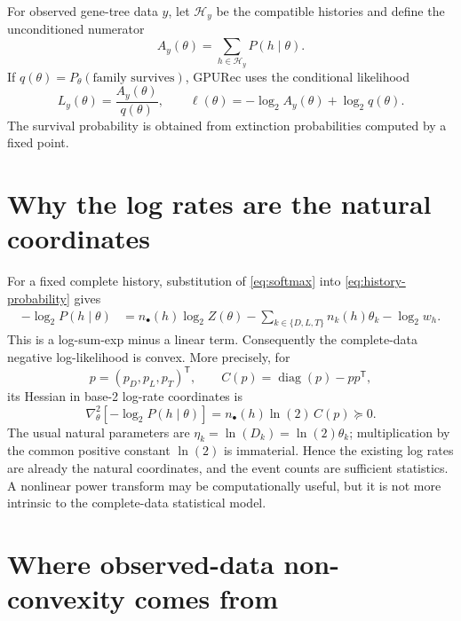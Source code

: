 \documentclass[11pt]{article}
\newcommand{\diag}{\operatorname{diag}}
\begin{document}
For observed gene-tree data $y$, let $\mathcal H_y$ be the compatible histories and define the
unconditioned numerator
\[
  A_y(\theta)=\sum_{h\in\mathcal H_y}P(h\mid\theta).
\]
If $q(\theta)=P_\theta(\text{family survives})$, GPURec uses the conditional likelihood
\begin{equation}
  L_y(\theta)=\frac{A_y(\theta)}{q(\theta)},
  \qquad
  \ell(\theta)=-\log_2 A_y(\theta)+\log_2 q(\theta).
  \label{eq:conditioned-likelihood}
\end{equation}
The survival probability is obtained from extinction probabilities computed by a fixed point.

\section{Why the log rates are the natural coordinates}

For a fixed complete history, substitution of \eqref{eq:softmax} into
\eqref{eq:history-probability} gives
\begin{align}
  -\log_2 P(h\mid\theta)
  &=n_\bullet(h)\log_2 Z(\theta)
    -\sum_{k\in\{D,L,T\}}n_k(h)\theta_k
    -\log_2 w_h.                                      \label{eq:complete-nll}
\end{align}
This is a log-sum-exp minus a linear term.  Consequently the complete-data negative
log-likelihood is convex.  More precisely, for
\[
  p=(p_D,p_L,p_T)^\mathsf T,
  \qquad
  C(p)=\diag(p)-pp^\mathsf T,
\]
its Hessian in base-2 log-rate coordinates is
\begin{equation}
  \nabla_\theta^2[-\log_2P(h\mid\theta)]
  =n_\bullet(h)\ln(2)\,C(p)\succeq0.                 \label{eq:complete-hessian}
\end{equation}
The usual natural parameters are $\eta_k=\ln(D_k)=\ln(2)\theta_k$; multiplication by the common
positive constant $\ln(2)$ is immaterial.  Hence the existing log rates are already the natural
coordinates, and the event counts are sufficient statistics.  A nonlinear power transform may
be computationally useful, but it is not more intrinsic to the complete-data statistical model.

\section{Where observed-data non-convexity comes from}
\end{document}
